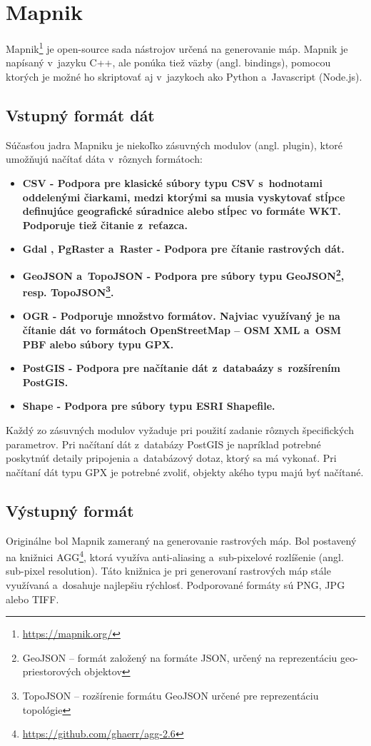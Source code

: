 \section{Mapnik}
\label{mapnik}
Mapnik\footnote{\url{https://mapnik.org/}} je open-source sada nástrojov určená na generovanie máp. Mapnik je napísaný v~jazyku C++, ale ponúka tiež väzby (angl. bindings), pomocou ktorých je možné ho skriptovať aj v~jazykoch ako Python a~Javascript (Node.js). 

\subsection*{Vstupný formát dát}
\label{mapnik_plugins}
Súčasťou jadra Mapniku je niekoľko zásuvných modulov (angl. plugin), ktoré umožňujú načítať dáta v~rôznych formátoch:
\begin{itemize}
  \item{\bf CSV \rm - Podpora pre klasické súbory typu CSV s~hodnotami oddelenými čiarkami, medzi ktorými sa musia vyskytovať stĺpce definujúce geografické súradnice alebo stĺpec vo formáte WKT. Podporuje tiež čitanie z~reťazca.}
  \item{\bf Gdal \rm, \bf PgRaster \rm a~\bf Raster \rm - Podpora pre čítanie rastrových dát.}
  \item{\bf GeoJSON \rm a~\bf TopoJSON \rm - Podpora pre súbory typu GeoJSON\footnote{GeoJSON -- formát založený na formáte JSON, určený na reprezentáciu geo-priestorových objektov}, resp. TopoJSON\footnote{TopoJSON -- rozšírenie formátu GeoJSON určené pre reprezentáciu topológie}.}
  \item{\bf OGR \rm - Podporuje množstvo formátov. Najviac využívaný je na čítanie dát vo formátoch OpenStreetMap -- OSM XML a~OSM PBF alebo súbory typu GPX.}
  \item{\bf PostGIS \rm - Podpora pre načítanie dát z~databaázy s~rozšírením PostGIS.}
  \item{\bf Shape \rm - Podpora pre súbory typu ESRI Shapefile.}
\end{itemize}

Každý zo zásuvných modulov vyžaduje pri použití zadanie rôznych špecifických parametrov. Pri načítaní dát z~databázy PostGIS je napríklad potrebné poskytnúť detaily pripojenia a~databázový dotaz, ktorý sa má vykonať. Pri načítaní dát typu GPX je potrebné zvoliť, objekty akého typu majú byť načítané.

\subsection*{Výstupný formát}
Originálne bol Mapnik zameraný na generovanie rastrových máp. Bol postavený na knižnici AGG\footnote{\url{https://github.com/ghaerr/agg-2.6}}, ktorá využíva anti-aliasing a~sub-pixelové rozlíšenie (angl. sub-pixel resolution). Táto knižnica je pri generovaní rastrových máp stále využívaná a~dosahuje najlepšiu rýchlosť. Podporované formáty sú PNG, JPG alebo TIFF.

